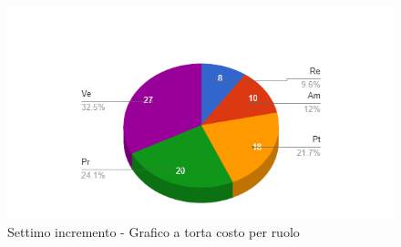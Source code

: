 {{\begin{longtable}{C{.4\freewidth} C{.2\freewidth} C{.2\freewidth} C{.2\freewidth} C{.2\freewidth} C{.2\freewidth} C{.2\freewidth} C{.2\freewidth} C{.2\freewidth}}
        \end{longtable}

        \begin{figure}[H]
          \includegraphics[width=15cm]{sezioni/Images/settimoT.png}
          \centering
          \caption{Settimo incremento - Grafico a torta costo per ruolo}
       \end{figure}
    }
    }

